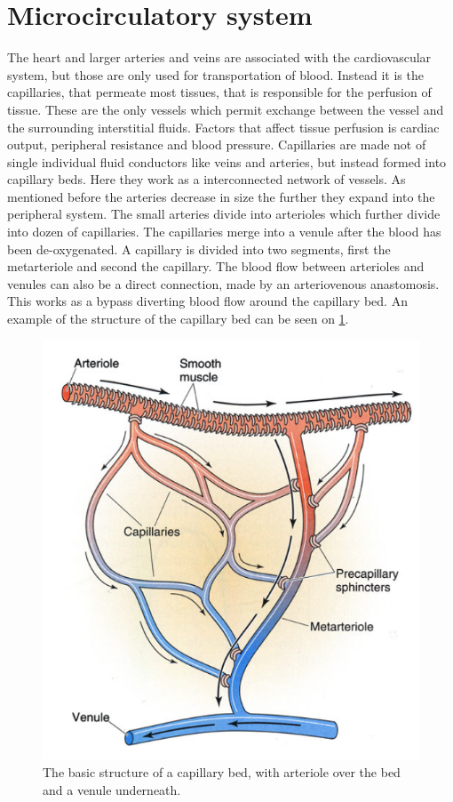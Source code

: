 
\section{Microcirculatory system}

The heart and larger arteries and veins are associated with the cardiovascular system, but those are only used for transportation of blood. Instead it is the capillaries, that permeate most tissues, that is responsible for the perfusion of tissue. These are the only vessels which permit exchange between the vessel and the surrounding interstitial fluids.  Factors that affect tissue perfusion is cardiac output, peripheral resistance and blood pressure. Capillaries are made not of single individual fluid conductors like veins and arteries, but instead formed into capillary beds. Here they work as a interconnected network of vessels.
As mentioned before the arteries decrease in size the further they expand into the peripheral system. The small arteries divide into arterioles which further divide into dozen of capillaries. The capillaries merge into a venule after the blood has been de-oxygenated. A capillary is divided into two segments, first the metarteriole and second the capillary. The blood flow between arterioles and venules can also be a direct connection, made by an arteriovenous anastomosis. This works as a bypass diverting blood flow around the capillary bed. An example of the structure of the capillary bed can be seen on \cref{fig:beds}.\cite{martini2012}
\begin{figure}[H]                                         
	\includegraphics[width=.6\textwidth]{figures/capillary_bed}  
	\caption{The basic structure of a capillary bed, with arteriole over the bed and a venule underneath.\cite{martini2012}}
	\label{fig:beds}  
\end{figure}          

